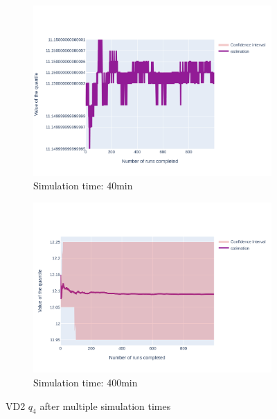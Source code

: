 \documentclass{article}
\begin{document}
\begin{figure}[H]
\begin{subfigure}{.495\textwidth}
    \end{subfigure}
    \begin{subfigure}{.495\textwidth}
        \centering
        \includegraphics[width=\textwidth]{../fig/quantile4/VD2_40mn.png}
        \caption{Simulation time: 40min}
    \end{subfigure}
    \begin{subfigure}{.495\textwidth}
        \centering
        \includegraphics[width=\textwidth]{../fig/quantile4/VD2_400mn.png}
        \caption{Simulation time: 400min}
        \label{fig: VD2 DAT q4 400 min}
    \end{subfigure}
    \caption{VD2 $q_4$ after multiple simulation times}
\end{figure}
\end{document}
